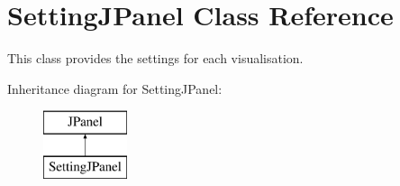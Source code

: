 \hypertarget{class_setting_j_panel}{\section{Setting\-J\-Panel Class Reference}
\label{class_setting_j_panel}
}


This class provides the settings for each visualisation.  


Inheritance diagram for Setting\-J\-Panel\-:\begin{figure}[H]
\begin{center}
\leavevmode
\includegraphics[height=2.000000cm]{class_setting_j_panel}
\end{center}
\end{figure}
